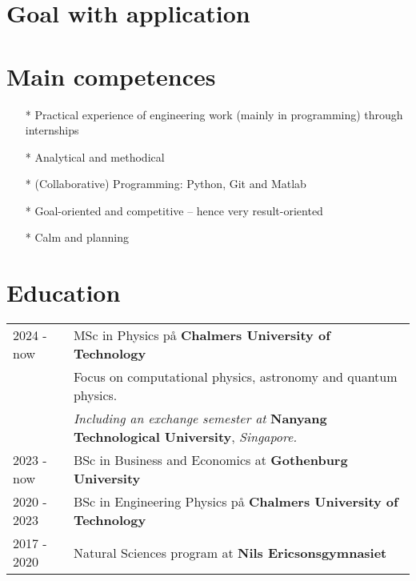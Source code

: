 \documentclass[a4paper,12pt]{article}
\begin{document}
\section{Goal with application}

\section{Main competences}
\begin{itemize}
    \item[*] Practical experience of engineering work (mainly in programming) through internships
    \item[*] Analytical and methodical
    \item[*] (Collaborative) Programming: Python, Git and Matlab
    \item[*] Goal-oriented and competitive -- hence very result-oriented
    \item[*] Calm and planning
\end{itemize}

\section{Education}
\begin{tabularx}{\linewidth}{@{}l X@{}}	
2024 - now &MSc in Physics på \textbf{Chalmers University of Technology} \hfill \\
&Focus on computational physics, astronomy and quantum physics. \\
&\textit{Including an exchange semester at} \textbf{Nanyang Technological University}, \textit{Singapore.} \\[5pt] 

2023 - now &BSc in Business and Economics at \textbf{Gothenburg University} \hfill \\[5pt] 

2020 - 2023 &BSc in Engineering Physics på \textbf{Chalmers University of Technology} \hfill \\[5pt] 

2017 - 2020 &Natural Sciences program at \textbf{Nils Ericsonsgymnasiet} \hfill \\ 
\end{tabularx}


\end{document}
